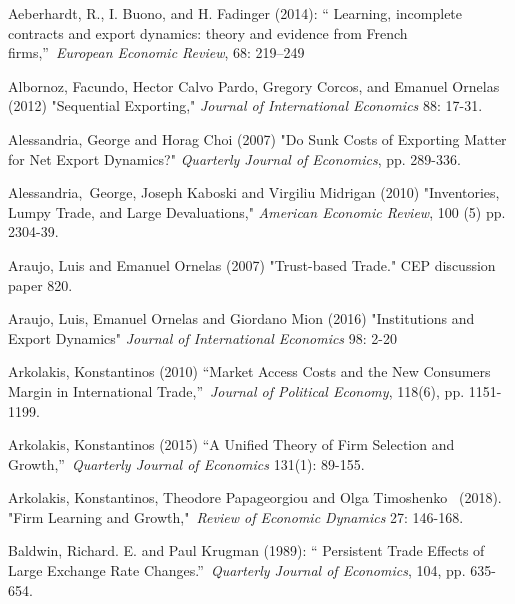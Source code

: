 \documentclass[12pt]{article}
\begin{document}
\begin{description}
\item Aeberhardt, R., I. Buono, and H. Fadinger (2014): \textquotedblleft
Learning, incomplete contracts and export dynamics: theory and evidence from
French firms,\textquotedblright\ \textit{European Economic Review}, 68:
219--249

\item Albornoz, Facundo, Hector Calvo Pardo, Gregory Corcos, and Emanuel
Ornelas (2012) "Sequential Exporting," \textit{Journal of International
Economics} 88: 17-31.

\item Alessandria, George and Horag Choi (2007) "Do Sunk Costs of Exporting
Matter for Net Export Dynamics?" \textit{Quarterly Journal of Economics},
pp. 289-336.

\item Alessandria,\ George, Joseph Kaboski and Virgiliu Midrigan (2010)
"Inventories, Lumpy Trade, and Large Devaluations," \textit{American
Economic Review}, 100 (5) pp. 2304-39.

\item Araujo, Luis and Emanuel Ornelas (2007) "Trust-based Trade." CEP
discussion paper 820.

\item Araujo, Luis, Emanuel Ornelas and Giordano Mion (2016) "Institutions
and Export Dynamics" \textit{Journal of International Economics }98: 2-20

\item Arkolakis, Konstantinos (2010) \textquotedblleft Market Access Costs
and the New Consumers Margin in International Trade,\textquotedblright\ 
\textit{Journal of Political Economy}, 118(6), pp. 1151-1199.

\item Arkolakis, Konstantinos (2015) \textquotedblleft A Unified Theory of
Firm Selection and Growth,\textquotedblright\ \textit{Quarterly Journal of
Economics} 131(1): 89-155.

\item Arkolakis, Konstantinos, Theodore Papageorgiou and Olga Timoshenko \
(2018). "Firm Learning and Growth,"\textit{\ Review of Economic Dynamics}
27: 146-168.

\item Baldwin, Richard. E. and Paul Krugman (1989): \textquotedblleft
Persistent Trade Effects of Large Exchange Rate Changes.\textquotedblright\ 
\textit{Quarterly Journal of Economics}, 104, pp. 635-654.


\end{description}
\end{document}
